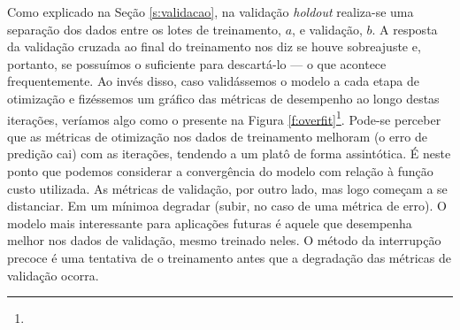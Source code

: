     Como explicado na Seção \ref{s:validacao}, na validação \textit{holdout} realiza-se uma separação dos dados entre os lotes de treinamento, $a$, e validação, $b$. A resposta da validação cruzada ao final do treinamento nos diz se houve sobreajuste e, portanto, se possuímos o suficiente para descartá-lo --- o que acontece frequentemente. Ao invés disso, caso validássemos o modelo a cada etapa de otimização e fizéssemos um gráfico das métricas de desempenho ao longo destas iterações, veríamos algo como o presente na Figura \ref{f:overfit}\DIFaddbegin \footnote{}\DIFaddend .
    Pode-se perceber que as métricas de otimização nos dados de treinamento melhoram (o erro de predição cai) com as iterações, tendendo a um platô de forma assintótica. É neste ponto que podemos considerar a convergência do modelo com relação à função custo utilizada. As métricas \DIFaddbegin {}\DIFaddend de validação, por outro lado, \DIFdelbegin {}\DIFdelend \DIFaddbegin {}\DIFaddend mas logo começam a se distanciar. Em \DIFdelbegin {}\DIFdelend \DIFaddbegin {}\DIFaddend um mínimo\DIFdelbegin {}\DIFdelend \DIFaddbegin {}\DIFaddend a degradar (subir, no caso de uma métrica de erro). O modelo mais interessante para aplicações futuras é aquele que desempenha melhor nos dados de validação, mesmo \DIFdelbegin {}\DIFdelend \DIFaddbegin {}\DIFaddend treinado neles. \DIFaddbegin {}\DIFaddend O método da interrupção precoce é uma tentativa de \DIFdelbegin {}\DIFdelend \DIFaddbegin {}\DIFaddend o treinamento antes que a degradação das métricas de validação ocorra.

